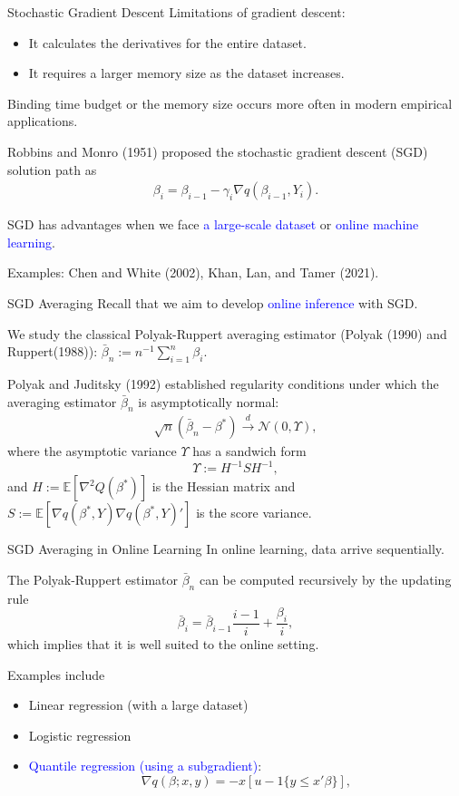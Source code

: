 \documentclass[beamer, t]{beamer}
\newcommand{\eqs}[1]{\begin{align*}#1\end{align*}}
\newcommand{\bit}{\begin{itemize}}
\newcommand{\eit}{\end{itemize}}
\newcommand{\tcb}{\textcolor{blue}}
\begin{document}
\begin{frame}{Stochastic Gradient Descent}
Limitations of gradient descent:
\bit
    \item It calculates the derivatives for the entire dataset.
    \item It requires a larger memory size as the dataset increases.
\eit
Binding time budget or the memory size occurs more often in modern empirical applications. 
\bigskip

Robbins and Monro (1951) proposed the stochastic gradient descent (SGD) solution path as
        \eqs{
            \beta_{i}=\beta_{i-1}-\gamma_{i}\nabla q\left(\beta_{i-1},Y_{i}\right).
        }

SGD has advantages when we face \tcb{a large-scale dataset} or \tcb{online machine learning}.

Examples: Chen and White (2002), Khan, Lan, and Tamer (2021). 
\end{frame}




\begin{frame}{SGD Averaging}
Recall that we aim to develop \tcb{online inference} with SGD. 
\bigskip

We study the classical Polyak-Ruppert averaging estimator (Polyak (1990) and Ruppert(1988)):
$\bar{\beta}_{n}:=n^{-1}\sum_{i=1}^{n}\beta_{i}$.
\medskip

Polyak and Juditsky (1992)
established regularity conditions under which
the averaging estimator $\bar{\beta}_{n}$ is asymptotically normal:
\begin{align*}
\sqrt{n}\left(\bar{\beta}_{n}-\beta^{*}\right)\overset{d}{\to}
\mathcal{N} (0, \Upsilon),
\end{align*}
where the asymptotic variance $\Upsilon$ has a sandwich form $$\Upsilon := H^{-1}S H^{-1},$$ and
$H := \mathbb{E}[\nabla^{2}Q\left(\beta^{*}\right)]$ is the Hessian matrix
and $S := \mathbb{E} \left[\nabla q\left(\beta^{*},Y\right)\nabla q\left(\beta^{*},Y\right)'\right]$ is the score variance.
\end{frame}


\begin{frame}{SGD Averaging in Online Learning}
In online learning, data arrive sequentially.
\bigskip


The  Polyak-Ruppert estimator $\bar{\beta}_{n}$ can be computed recursively
by the updating rule $$\bar{\beta}_{i}=\bar{\beta}_{i-1}\frac{i-1}{i}+\frac{\beta_{i}}{i},$$
which implies that it is well suited to the online setting.

\bigskip

Examples include
\bit
    \item Linear regression (with a large dataset)
    \item Logistic regression
    \item \tcb{Quantile regression (using a subgradient)}:
    		$$
			\nabla q(\beta; x,y)= - x[u-1\{y\leq x'\beta\}],
			$$
\eit
\end{frame}
\end{document}
